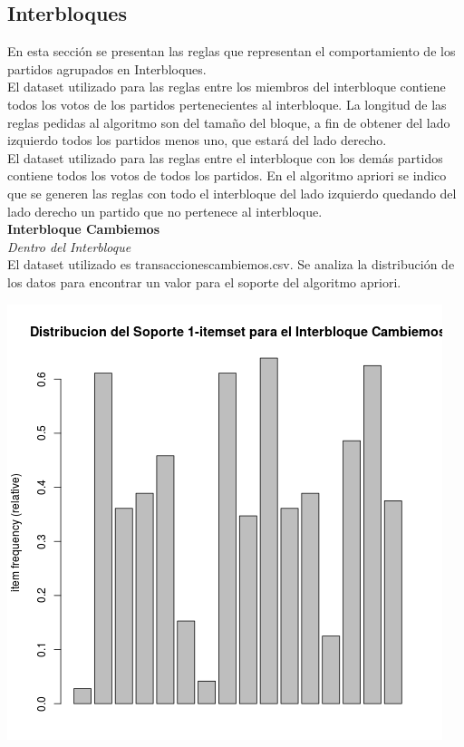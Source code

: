 \documentclass{endm}
\begin{document}
\subsection{Interbloques}

En esta sección se presentan las reglas que representan el comportamiento de los partidos agrupados en Interbloques.\\

El dataset utilizado para las reglas entre los miembros del interbloque contiene todos los votos de los partidos pertenecientes al interbloque. La longitud de las reglas pedidas al algoritmo son del tamaño del bloque, a fin de obtener del lado izquierdo todos los partidos menos uno, que estará del lado derecho.\\

El dataset utilizado para las reglas entre el interbloque con los demás partidos contiene todos los votos de todos los partidos. En el algoritmo apriori se indico que se generen las reglas con todo el interbloque del lado izquierdo quedando del lado derecho un partido que no pertenece al interbloque. \\

\textbf{Interbloque Cambiemos}\\

\textit{Dentro del Interbloque} \\

El dataset utilizado es transaccionescambiemos.csv. Se analiza la distribución de los datos para encontrar un valor para el soporte del algoritmo apriori. \\

\begin{center}
\includegraphics[scale=0.4]{graficos/soportesCambiemos.png}
\end{center}
\end{document}
